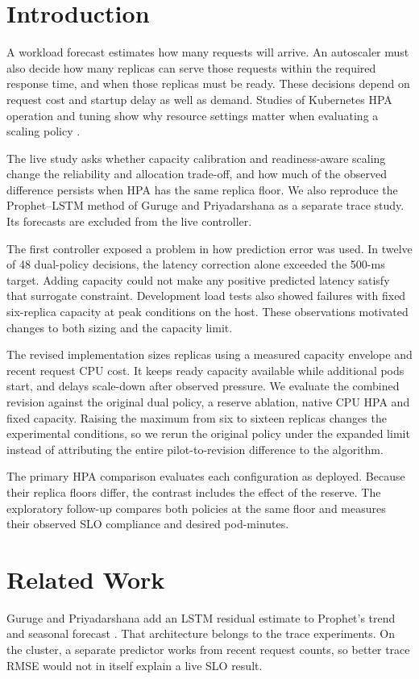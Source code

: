 \documentclass[10pt,twocolumn,a4paper]{article}
\begin{document}
\par


\section{Introduction}
A workload forecast estimates how many requests will arrive. An autoscaler must also decide how many replicas can serve those requests within the required response time, and when those replicas must be ready. These decisions depend on request cost and startup delay as well as demand. Studies of Kubernetes HPA operation and tuning show why resource settings matter when evaluating a scaling policy \cite{j01,j02}.

The live study asks whether capacity calibration and readiness-aware scaling change the reliability and allocation trade-off, and how much of the observed difference persists when HPA has the same replica floor. We also reproduce the Prophet--LSTM method of Guruge and Priyadarshana \cite{guruge} as a separate trace study. Its forecasts are excluded from the live controller.

The first controller exposed a problem in how prediction error was used. In twelve of 48 dual-policy decisions, the latency correction alone exceeded the 500-ms target. Adding capacity could not make any positive predicted latency satisfy that surrogate constraint. Development load tests also showed failures with fixed six-replica capacity at peak conditions on the host. These observations motivated changes to both sizing and the capacity limit.

The revised implementation sizes replicas using a measured capacity envelope and recent request CPU cost. It keeps ready capacity available while additional pods start, and delays scale-down after observed pressure. We evaluate the combined revision against the original dual policy, a reserve ablation, native CPU HPA and fixed capacity. Raising the maximum from six to sixteen replicas changes the experimental conditions, so we rerun the original policy under the expanded limit instead of attributing the entire pilot-to-revision difference to the algorithm.

The primary HPA comparison evaluates each configuration as deployed. Because their replica floors differ, the contrast includes the effect of the reserve. The exploratory follow-up compares both policies at the same floor and measures their observed SLO compliance and desired pod-minutes.

\section{Related Work}
Guruge and Priyadarshana add an LSTM residual estimate to Prophet's trend and seasonal forecast \cite{guruge,prophet,lstm}. That architecture belongs to the trace experiments. On the cluster, a separate predictor works from recent request counts, so better trace RMSE would not in itself explain a live SLO result.
\end{document}
